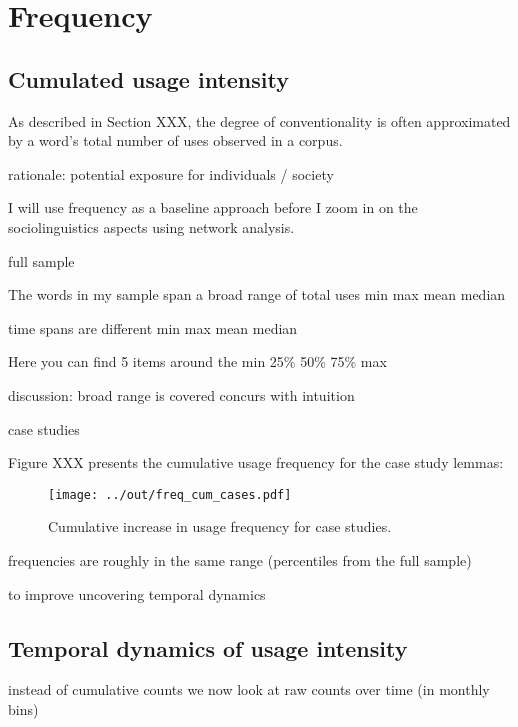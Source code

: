 \documentclass[a4paper, abstract=on]{scrartcl}
\begin{document}
\section{Frequency}

  \subsection{Cumulated usage intensity}

    As described in Section XXX, the degree of conventionality is often approximated by a word's total number of uses observed in a corpus.

      rationale: potential exposure for individuals / society

      I will use frequency as a baseline approach before I zoom in on the sociolinguistics aspects using network analysis.

    full sample

      The words in my sample span a broad range of total uses
        min
        max
        mean
        median

      time spans are different
        min
        max
        mean
        median

      Here you can find 5 items around the
        min
        25\%
        50\%
        75\%
        max

      discussion:
        broad range is covered
        concurs with intuition

    case studies

      Figure XXX presents the cumulative usage frequency for the case study lemmas:

        \begin{figure}[H]
          \caption{Cumulative increase in usage frequency for case studies.}
          \texttt{[image: ../out/freq\_cum\_cases.pdf]}
          \centering
        \end{figure}

      frequencies are roughly in the same range (percentiles from the full sample)

      to improve
        uncovering temporal dynamics

  \subsection{Temporal dynamics of usage intensity}

    instead of cumulative counts we now look at raw counts over time (in monthly bins)
\end{document}
